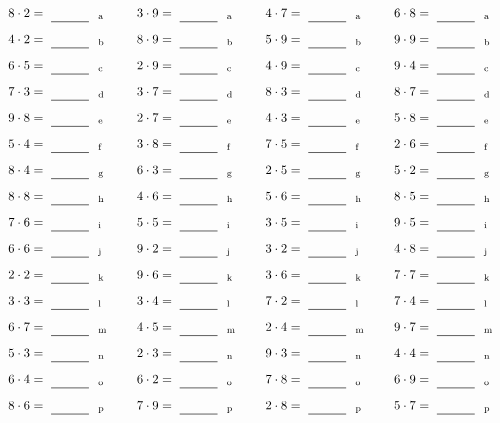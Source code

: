 \documentclass
[
  draft    = true,
  fontsize = 11pt,
  parskip  = half-
]
{scrartcl}
\begin{document}
\par\vfill\par
\begin{align*}
    \pline{8\cdot2}&=\rline{a}
  & \pline{3\cdot9}&=\rline{a}
  & \pline{4\cdot7}&=\rline{a}
  & \pline{6\cdot8}&=\rline{a} \\[1ex]
    \pline{4\cdot2}&=\rline{b}
  & \pline{8\cdot9}&=\rline{b}
  & \pline{5\cdot9}&=\rline{b}
  & \pline{9\cdot9}&=\rline{b} \\[1ex]
    \pline{6\cdot5}&=\rline{c}
  & \pline{2\cdot9}&=\rline{c}
  & \pline{4\cdot9}&=\rline{c}
  & \pline{9\cdot4}&=\rline{c} \\[1ex]
    \pline{7\cdot3}&=\rline{d}
  & \pline{3\cdot7}&=\rline{d}
  & \pline{8\cdot3}&=\rline{d}
  & \pline{8\cdot7}&=\rline{d} \\[1ex]
    \pline{9\cdot8}&=\rline{e}
  & \pline{2\cdot7}&=\rline{e}
  & \pline{4\cdot3}&=\rline{e}
  & \pline{5\cdot8}&=\rline{e} \\[1ex]
    \pline{5\cdot4}&=\rline{f}
  & \pline{3\cdot8}&=\rline{f}
  & \pline{7\cdot5}&=\rline{f}
  & \pline{2\cdot6}&=\rline{f} \\[1ex]
    \pline{8\cdot4}&=\rline{g}
  & \pline{6\cdot3}&=\rline{g}
  & \pline{2\cdot5}&=\rline{g}
  & \pline{5\cdot2}&=\rline{g} \\[1ex]
    \pline{8\cdot8}&=\rline{h}
  & \pline{4\cdot6}&=\rline{h}
  & \pline{5\cdot6}&=\rline{h}
  & \pline{8\cdot5}&=\rline{h} \\[1ex]
    \pline{7\cdot6}&=\rline{i}
  & \pline{5\cdot5}&=\rline{i}
  & \pline{3\cdot5}&=\rline{i}
  & \pline{9\cdot5}&=\rline{i} \\[1ex]
    \pline{6\cdot6}&=\rline{j}
  & \pline{9\cdot2}&=\rline{j}
  & \pline{3\cdot2}&=\rline{j}
  & \pline{4\cdot8}&=\rline{j} \\[1ex]
    \pline{2\cdot2}&=\rline{k}
  & \pline{9\cdot6}&=\rline{k}
  & \pline{3\cdot6}&=\rline{k}
  & \pline{7\cdot7}&=\rline{k} \\[1ex]
    \pline{3\cdot3}&=\rline{l}
  & \pline{3\cdot4}&=\rline{l}
  & \pline{7\cdot2}&=\rline{l}
  & \pline{7\cdot4}&=\rline{l} \\[1ex]
    \pline{6\cdot7}&=\rline{m}
  & \pline{4\cdot5}&=\rline{m}
  & \pline{2\cdot4}&=\rline{m}
  & \pline{9\cdot7}&=\rline{m} \\[1ex]
    \pline{5\cdot3}&=\rline{n}
  & \pline{2\cdot3}&=\rline{n}
  & \pline{9\cdot3}&=\rline{n}
  & \pline{4\cdot4}&=\rline{n} \\[1ex]
    \pline{6\cdot4}&=\rline{o}
  & \pline{6\cdot2}&=\rline{o}
  & \pline{7\cdot8}&=\rline{o}
  & \pline{6\cdot9}&=\rline{o} \\[1ex]
    \pline{8\cdot6}&=\rline{p}
  & \pline{7\cdot9}&=\rline{p}
  & \pline{2\cdot8}&=\rline{p}
  & \pline{5\cdot7}&=\rline{p}
\end{align*}
\end{document}
